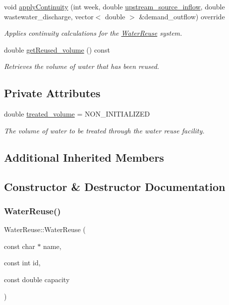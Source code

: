 \begin{DoxyCompactItemize}
void \mbox{\hyperlink{classWaterReuse_ab8ffb10c69790047a3a5dda66cfaf3ee}{apply\+Continuity}} (int week, double \mbox{\hyperlink{classWaterSource_a7a69b2e9b6030f1035e6cf44d2918ee5}{upstream\+\_\+source\+\_\+inflow}}, double wastewater\+\_\+discharge, vector$<$ double $>$ \&demand\+\_\+outflow) override
\begin{DoxyCompactList}\small\item\em Applies continuity calculations for the \mbox{\hyperlink{classWaterReuse}{Water\+Reuse}} system. \end{DoxyCompactList}\item 
double \mbox{\hyperlink{classWaterReuse_a78c905f77ca46fbbb2251f9cfa9a04de}{get\+Reused\+\_\+volume}} () const
\begin{DoxyCompactList}\small\item\em Retrieves the volume of water that has been reused. \end{DoxyCompactList}\end{DoxyCompactItemize}
\subsection*{Private Attributes}
\begin{DoxyCompactItemize}
\item 
double \mbox{\hyperlink{classWaterReuse_a47ef62349f0092ccdda066905c89111a}{treated\+\_\+volume}} = N\+O\+N\+\_\+\+I\+N\+I\+T\+I\+A\+L\+I\+Z\+ED
\begin{DoxyCompactList}\small\item\em The volume of water to be treated through the water reuse facility. \end{DoxyCompactList}\end{DoxyCompactItemize}
\subsection*{Additional Inherited Members}


\subsection{Constructor \& Destructor Documentation}
\mbox{\label{classWaterReuse_a0493da65856f50fad2bc2d2c087f378f}} 
\subsubsection{\texorpdfstring{Water\+Reuse()}{WaterReuse()}\hspace{0.1cm}{\footnotesize\ttfamily [1/3]}}
{\footnotesize\ttfamily Water\+Reuse\+::\+Water\+Reuse (\begin{DoxyParamCaption}\item[{const char $\ast$}]{name,  }\item[{const int}]{id,  }\item[{const double}]{capacity }\end{DoxyParamCaption})}



